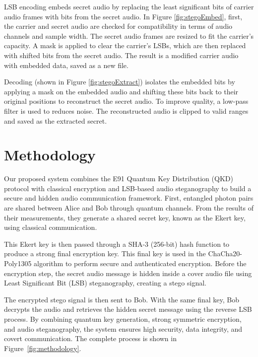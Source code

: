 \documentclass[a4paper]{cas-sc}
\begin{document}
LSB encoding embeds secret audio by replacing the least significant bits of carrier audio frames with bits from the secret audio. In Figure \ref{fig:stegoEmbed}, first, the carrier and secret audio are checked for compatibility in terms of audio channels and sample width. The secret audio frames are resized to fit the carrier's capacity. A mask is applied to clear the carrier's LSBs, which are then replaced with shifted bits from the secret audio. The result is a modified carrier audio with embedded data, saved as a new file.

Decoding (shown in Figure \ref{fig:stegoExtract}) isolates the embedded bits by applying a mask on the embedded audio and shifting these bits back to their original positions to reconstruct the secret audio. To improve quality, a low-pass filter is used to reduces noise. The reconstructed audio is clipped to valid ranges and saved as the extracted secret.

\section{Methodology}
\label{sec:methodology}
Our proposed system combines the E91 Quantum Key Distribution (QKD) protocol with classical encryption and LSB-based audio steganography to build a secure and hidden audio communication framework. First, entangled photon pairs are shared between Alice and Bob through quantum channels. From the results of their measurements, they generate a shared secret key, known as the Ekert key, using classical communication.

This Ekert key is then passed through a SHA-3 (256-bit) hash function to produce a strong final encryption key. This final key is used in the ChaCha20-Poly1305 algorithm to perform secure and authenticated encryption. Before the encryption step, the secret audio message is hidden inside a cover audio file using Least Significant Bit (LSB) steganography, creating a stego signal.

The encrypted stego signal is then sent to Bob. With the same final key, Bob decrypts the audio and retrieves the hidden secret message using the reverse LSB process. By combining quantum key generation, strong symmetric encryption, and audio steganography, the system ensures high security, data integrity, and covert communication. The complete process is shown in Figure~\ref{fig:methodology}.
\end{document}
